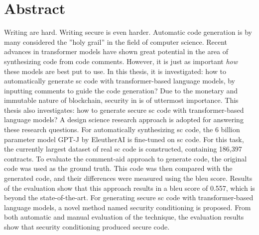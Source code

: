 \chapter*{Abstract}

Writing  are hard. Writing secure  is even harder. Automatic code generation is by many considered the ”holy grail” in the field of computer science. Recent advances in transformer models have shown great potential in the area of synthesizing code from code comments. However, it is just as important \textit{how} these models are best put to use. In this thesis, it is investigated: how to automatically generate \acrlong{sc} code with transformer-based language models, by inputting comments to guide the code generation? Due to the monetary and immutable nature of blockchain, security in  is of uttermost importance. This thesis also investigates: how to generate secure \acrlong{sc} code with transformer-based language models? A design science research approach is adopted for answering these research questions. For automatically synthesizing \acrshort{sc} code, the 6 billion parameter model GPT-J by EleutherAI is fine-tuned on \acrshort{sc} code. For this task, the currently largest dataset of real \acrshort{sc} code is constructed, containing 186,397 contracts. To evaluate the comment-aid approach to generate code, the original code was used as the ground truth. This code was then compared with the generated code, and their differences were measured using the \acrfull{bleu} score. Results of the evaluation show that this approach results in a \acrshort{bleu} score of 0.557, which is beyond the state-of-the-art. For generating secure \acrlong{sc} code with transformer-based language models, a novel method named security conditioning is proposed. From both automatic and manual evaluation of the technique, the evaluation results show that security conditioning produced secure code.


%




